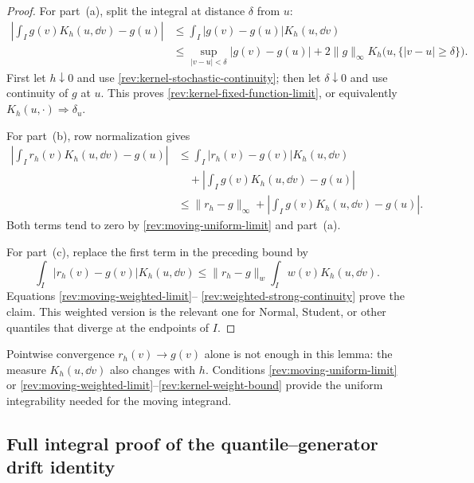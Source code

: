 \begin{proof}
For part~(a), split the integral at distance $\delta$ from $u$:
\begin{align*}
\left|\int_Ig(v)K_h(u,\dd v)-g(u)\right|
&\le \int_I|g(v)-g(u)|K_h(u,\dd v)\\
&\le \sup_{|v-u|<\delta}|g(v)-g(u)|
 +2\lVert g\rVert_\infty
 K_h\bigl(u,\{|v-u|\ge\delta\}\bigr).
\end{align*}
First let $h\downarrow0$ and use
\eqref{rev:kernel-stochastic-continuity}; then let $\delta\downarrow0$ and
use continuity of $g$ at $u$.  This proves
\eqref{rev:kernel-fixed-function-limit}, or equivalently
$K_h(u,\cdot)\Rightarrow\delta_u$.

For part~(b), row normalization gives
\begin{align*}
\left|\int_Ir_h(v)K_h(u,\dd v)-g(u)\right|
&\le \int_I|r_h(v)-g(v)|K_h(u,\dd v)\\
&\quad+\left|\int_Ig(v)K_h(u,\dd v)-g(u)\right|\\
&\le \lVert r_h-g\rVert_\infty
 +\left|\int_Ig(v)K_h(u,\dd v)-g(u)\right|.
\end{align*}
Both terms tend to zero by \eqref{rev:moving-uniform-limit} and part~(a).

For part~(c), replace the first term in the preceding bound by
\[
\int_I|r_h(v)-g(v)|K_h(u,\dd v)
\le \lVert r_h-g\rVert_w\int_Iw(v)K_h(u,\dd v).
\]
Equations \eqref{rev:moving-weighted-limit}--
\eqref{rev:weighted-strong-continuity} prove the claim.  This weighted version
is the relevant one for Normal, Student, or other quantiles that diverge at the
endpoints of $I$.
\end{proof}

Pointwise convergence $r_h(v)\to g(v)$ alone is not enough in this lemma: the
measure $K_h(u,\dd v)$ also changes with $h$.  Conditions
\eqref{rev:moving-uniform-limit} or
\eqref{rev:moving-weighted-limit}--\eqref{rev:kernel-weight-bound} provide the
uniform integrability needed for the moving integrand.

\subsection{Full integral proof of the quantile--generator drift identity}
\label{rev:app-drift-identity-proof}

